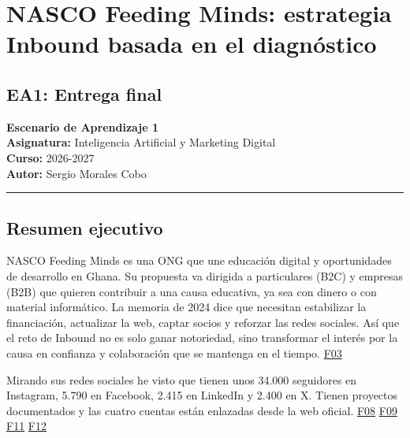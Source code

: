 \documentclass[
]{article}
\author{}
\date{}
\begin{document}
\hypertarget{nasco-feeding-minds-estrategia-inbound-basada-en-el-diagnuxf3stico}{%
\section{NASCO Feeding Minds: estrategia Inbound basada en el
diagnóstico}\label{nasco-feeding-minds-estrategia-inbound-basada-en-el-diagnuxf3stico}}

\hypertarget{ea1-entrega-final}{%
\subsection{EA1: Entrega final}\label{ea1-entrega-final}}

\textbf{Escenario de Aprendizaje 1}\\
\textbf{Asignatura:} Inteligencia Artificial y Marketing Digital\\
\textbf{Curso:} 2026-2027\\
\textbf{Autor:} Sergio Morales Cobo

\begin{center}\rule{0.5\linewidth}{0.5pt}\end{center}

\hypertarget{resumen-ejecutivo}{%
\subsection{Resumen ejecutivo}\label{resumen-ejecutivo}}

NASCO Feeding Minds es una ONG que une educación digital y oportunidades
de desarrollo en Ghana. Su propuesta va dirigida a particulares (B2C) y
empresas (B2B) que quieren contribuir a una causa educativa, ya sea con
dinero o con material informático. La memoria de 2024 dice que necesitan
estabilizar la financiación, actualizar la web, captar socios y reforzar
las redes sociales. Así que el reto de Inbound no es solo ganar
notoriedad, sino transformar el interés por la causa en confianza y
colaboración que se mantenga en el tiempo.
\href{https://nascoict.org/wp-content/uploads/MEMORIA-2024.pdf}{F03}

Mirando sus redes sociales he visto que tienen unos 34.000 seguidores en
Instagram, 5.790 en Facebook, 2.415 en LinkedIn y 2.400 en X. Tienen
proyectos documentados y las cuatro cuentas están enlazadas desde la web
oficial. \href{https://www.instagram.com/nasco_ict/}{F08}
\href{https://www.facebook.com/NascoICT/}{F09}
\href{https://twitter.com/nasco_ict/}{F11}
\href{https://www.linkedin.com/posts/nasco-feeding-minds_nascofoundation-educaci\%C3\%B3ndigital-impactosocial-activity-7500847528586846208-5q6E}{F12}
\end{document}
